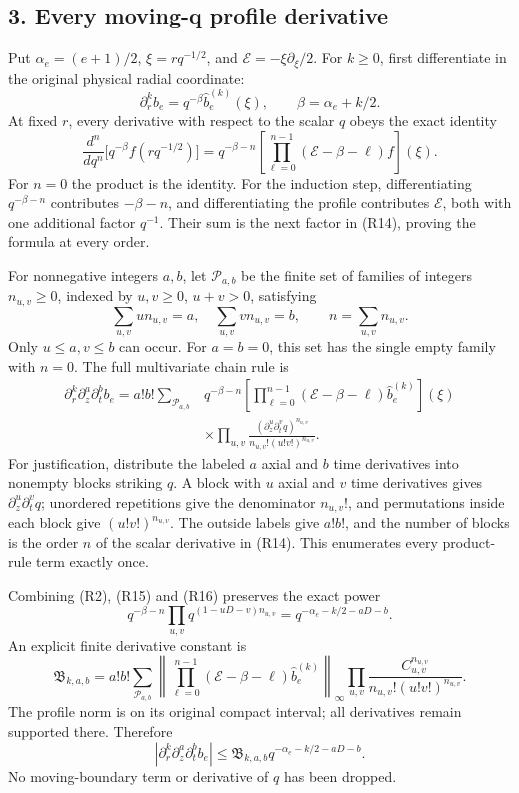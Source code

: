 \documentclass[10pt,a4paper]{article}
\newcounter{none}
\begin{document}
\subsection{3. Every moving-q profile derivative}\label{nsupstream:radial_stress_reconstruction_audit:every-moving-q-profile-derivative}

Put \(\alpha_e=(e+1)/2\), \(\xi=rq^{-1/2}\), and \(\mathscr E=-\xi\partial_\xi/2\). For \(k\ge0\), first differentiate in the original physical radial coordinate: \[
\partial_r^kb_e=q^{-\beta}\widehat b_e^{(k)}(\xi),\qquad \beta=\alpha_e+k/2.
\tag{R13}
\] At fixed \(r\), every derivative with respect to the scalar \(q\) obeys the exact identity \[
\frac{d^n}{dq^n}\big[q^{-\beta}f(rq^{-1/2})\big]
=q^{-\beta-n}\left[\prod_{\ell=0}^{n-1}(\mathscr E-\beta-\ell)f\right](\xi).
\tag{R14}
\] For \(n=0\) the product is the identity. For the induction step, differentiating \(q^{-\beta-n}\) contributes \(-\beta-n\), and differentiating the profile contributes \(\mathscr E\), both with one additional factor \(q^{-1}\). Their sum is the next factor in (R14), proving the formula at every order.

For nonnegative integers \(a,b\), let \(\mathcal P_{a,b}\) be the finite set of families of integers \(n_{u,v}\ge0\), indexed by \(u,v\ge0\), \(u+v>0\), satisfying \[
\sum_{u,v}u n_{u,v}=a,\quad \sum_{u,v}v n_{u,v}=b,
\qquad n=\sum_{u,v}n_{u,v}.
\tag{R15}
\] Only \(u\le a,v\le b\) can occur. For \(a=b=0\), this set has the single empty family with \(n=0\). The full multivariate chain rule is \[
\begin{aligned}
\partial_r^k\partial_z^a\partial_t^bb_e
=a!b!\sum_{\mathcal P_{a,b}}&q^{-\beta-n}
\left[\prod_{\ell=0}^{n-1}(\mathscr E-\beta-\ell)\widehat b_e^{(k)}\right](\xi)\\
&\times\prod_{u,v}
\frac{(\partial_z^u\partial_t^vq)^{n_{u,v}}}
{n_{u,v}!(u!v!)^{n_{u,v}}}.
\end{aligned}
\tag{R16}
\] For justification, distribute the labeled \(a\) axial and \(b\) time derivatives into nonempty blocks striking \(q\). A block with \(u\) axial and \(v\) time derivatives gives \(\partial_z^u\partial_t^vq\); unordered repetitions give the denominator \(n_{u,v}!\), and permutations inside each block give \((u!v!)^{n_{u,v}}\). The outside labels give \(a!b!\), and the number of blocks is the order \(n\) of the scalar derivative in (R14). This enumerates every product-rule term exactly once.

Combining (R2), (R15) and (R16) preserves the exact power \[
q^{-\beta-n}\prod_{u,v}q^{(1-uD-v)n_{u,v}}
=q^{-\alpha_e-k/2-aD-b}.
\tag{R17}
\] An explicit finite derivative constant is \[
\mathfrak B_{k,a,b}=a!b!\sum_{\mathcal P_{a,b}}
\left\|\prod_{\ell=0}^{n-1}(\mathscr E-\beta-\ell)\widehat b_e^{(k)}\right\|_\infty
\prod_{u,v}\frac{C_{u,v}^{n_{u,v}}}{n_{u,v}!(u!v!)^{n_{u,v}}}.
\tag{R18}
\] The profile norm is on its original compact interval; all derivatives remain supported there. Therefore \[
|\partial_r^k\partial_z^a\partial_t^bb_e|
\le\mathfrak B_{k,a,b}q^{-\alpha_e-k/2-aD-b}.
\tag{R19}
\] No moving-boundary term or derivative of \(q\) has been dropped.
\end{document}
